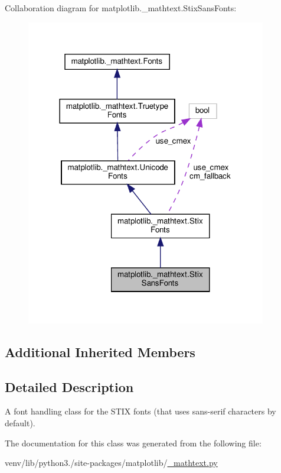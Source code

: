 Collaboration diagram for matplotlib.\+\_\+mathtext.\+Stix\+Sans\+Fonts\+:
\nopagebreak
\begin{figure}[H]
\begin{center}
\leavevmode
\includegraphics[width=298pt]{classmatplotlib_1_1__mathtext_1_1StixSansFonts__coll__graph}
\end{center}
\end{figure}
\subsection*{Additional Inherited Members}


\subsection{Detailed Description}
\begin{DoxyVerb}A font handling class for the STIX fonts (that uses sans-serif
characters by default).
\end{DoxyVerb}
 

The documentation for this class was generated from the following file\+:\begin{DoxyCompactItemize}
\item 
venv/lib/python3./site-\/packages/matplotlib/\hyperlink{__mathtext_8py}{\+\_\+mathtext.\+py}\end{DoxyCompactItemize}
